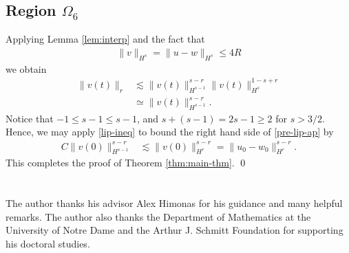 \documentclass[a0,portrait]{a0poster}
\begin{document}
\begin{multicols}{3}
\subsection*{Region $\Omega_{6}$} 
\label{ssec:case-2}
%
%
Applying Lemma \ref{lem:interp} and the fact that 
%
%
\begin{equation*}
\begin{split}
  \|v\|_{H^{s}} = \|u - w \|_{H^{s}} \le 4R
\end{split}
\end{equation*}
%
%
we obtain
%
%
\begin{equation}
  \label{pre-lip-ap}
\begin{split}
  \| v(t) \|_{r} & \lesssim \| v(t) \|_{H^{s-1}}^{s-r} \|v(t) \|_{H^{s}}^{1-s+r}
  \\
  & \simeq \| v(t) \|_{H^{s-1}}^{s-r}.
\end{split}
\end{equation}
%
%
Notice that $-1 \le s-1 \le s-1$, and $s + (s-1) = 2s-1 \ge 2$ for $s >3/2$.
Hence, we may apply \eqref{lip-ineq} to bound the right hand side of
\eqref{pre-lip-ap} by
%
%
\begin{equation*}
\begin{split}
  C \|v(0) \|_{H^{s-1}}^{s-r}
  & \lesssim \|v(0) \|_{H^{r}}^{s-r} 
  = \|u_{0} - w_{0}\|_{H^{r}}^{s-r}.
\end{split}
\end{equation*}
%
%
This completes the proof of Theorem \ref{thm:main-thm}. \qed
 

\section*{}

The author thanks his advisor Alex Himonas for 
his guidance and many helpful remarks. The author also thanks the Department of 
Mathematics at the University of Notre Dame and the Arthur J. Schmitt Foundation for 
supporting his doctoral 
studies.

 



\end{multicols}


\end{document}
